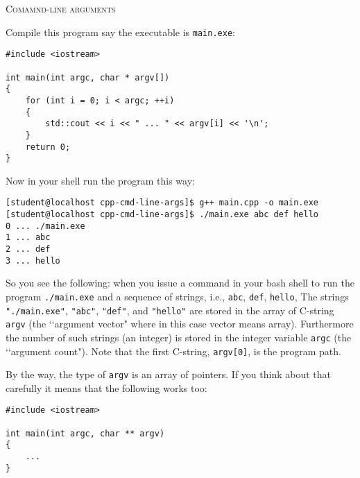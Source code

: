 \textsc{Comamnd-line arguments}

Compile this program say the executable is \texttt{main.exe}:
\begin{Verbatim}[frame=single,fontsize=\footnotesize]
#include <iostream>

int main(int argc, char * argv[])
{
    for (int i = 0; i < argc; ++i)
    {
        std::cout << i << " ... " << argv[i] << '\n';
    }
    return 0;
}
\end{Verbatim}
Now in your shell run the program this way:
\begin{Verbatim}[frame=single,fontsize=\footnotesize]
[student@localhost cpp-cmd-line-args]$ g++ main.cpp -o main.exe
[student@localhost cpp-cmd-line-args]$ ./main.exe abc def hello
0 ... ./main.exe
1 ... abc
2 ... def
3 ... hello
\end{Verbatim}

So you see the following: when you issue a command in your
bash shell to run the program \verb!./main.exe! and a sequence
of strings, i.e., \texttt{abc}, \texttt{def}, \texttt{hello},
The strings
\verb!"./main.exe"!,
\verb!"abc"!,
\verb!"def"!, and
\verb!"hello"!
are stored in the array of C-string \texttt{argv} (the \lq\lq argument vector"
where in this case vector means array).
Furthermore the number of such strings (an integer) is stored in
the integer variable \texttt{argc} (the \lq\lq argument count").
Note that the first C-string, \texttt{argv[0]}, is the program path.

By the way, the type of \verb!argv! is an array of pointers.
If you think about that carefully it means that the following works too:
\begin{Verbatim}[frame=single,fontsize=\footnotesize]
#include <iostream>

int main(int argc, char ** argv)
{
    ...
}
\end{Verbatim}
